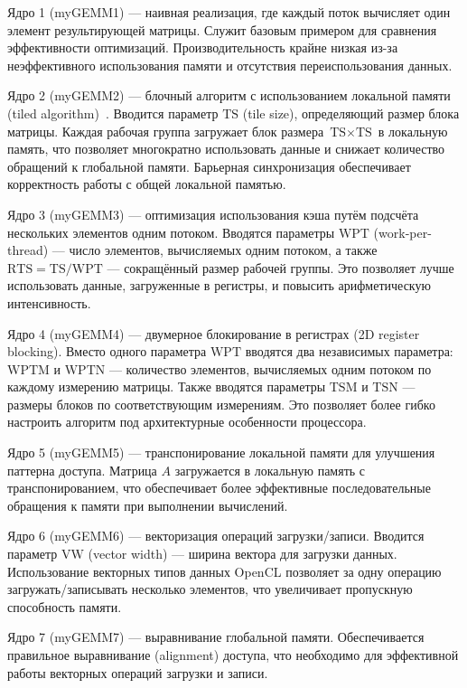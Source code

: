 Ядро 1 (myGEMM1) --- наивная реализация, где каждый поток вычисляет один элемент результирующей матрицы. Служит базовым примером для сравнения эффективности оптимизаций. Производительность крайне низкая из-за неэффективного использования памяти и отсутствия переиспользования данных.

Ядро 2 (myGEMM2) --- блочный алгоритм с использованием локальной памяти (tiled algorithm)~\cite{goto2008anatomy}. Вводится параметр $\text{TS}$ (tile size), определяющий размер блока матрицы. Каждая рабочая группа загружает блок размера $\text{TS} \times \text{TS}$ в локальную память, что позволяет многократно использовать данные и снижает количество обращений к глобальной памяти. Барьерная синхронизация обеспечивает корректность работы с общей локальной памятью.

Ядро 3 (myGEMM3) --- оптимизация использования кэша путём подсчёта нескольких элементов одним потоком. Вводятся параметры $\text{WPT}$ (work-per-thread) --- число элементов, вычисляемых одним потоком, а также $\text{RTS} = \text{TS}/\text{WPT}$ --- сокращённый размер рабочей группы. Это позволяет лучше использовать данные, загруженные в регистры, и повысить арифметическую интенсивность.

Ядро 4 (myGEMM4) --- двумерное блокирование в регистрах (2D register blocking). Вместо одного параметра $\text{WPT}$ вводятся два независимых параметра: $\text{WPTM}$ и $\text{WPTN}$ --- количество элементов, вычисляемых одним потоком по каждому измерению матрицы. Также вводятся параметры $\text{TSM}$ и $\text{TSN}$ --- размеры блоков по соответствующим измерениям. Это позволяет более гибко настроить алгоритм под архитектурные особенности процессора.

Ядро 5 (myGEMM5) --- транспонирование локальной памяти для улучшения паттерна доступа. Матрица $A$ загружается в локальную память с транспонированием, что обеспечивает более эффективные последовательные обращения к памяти при выполнении вычислений.

Ядро 6 (myGEMM6) --- векторизация операций загрузки/записи. Вводится параметр $\text{VW}$ (vector width) --- ширина вектора для загрузки данных. Использование векторных типов данных OpenCL позволяет за одну операцию загружать/записывать несколько элементов, что увеличивает пропускную способность памяти.

Ядро 7 (myGEMM7) --- выравнивание глобальной памяти. Обеспечивается правильное выравнивание (alignment) доступа, что необходимо для эффективной работы векторных операций загрузки и записи.

